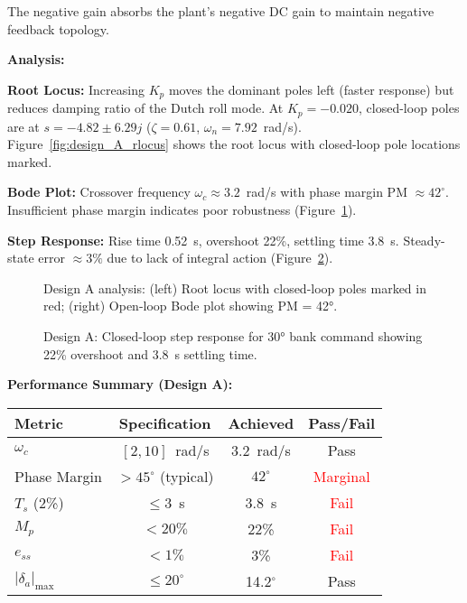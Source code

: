 The negative gain absorbs the plant's negative DC gain to maintain negative feedback topology.

\textbf{Analysis:}

\textbf{Root Locus:} Increasing $K_p$ moves the dominant poles left (faster response) but reduces damping ratio of the Dutch roll mode. At $K_p=-0.020$, closed-loop poles are at $s = -4.82 \pm 6.29j$ ($\zeta=0.61$, $\omega_n=7.92$~rad/s). Figure~\ref{fig:design_A_rlocus} shows the root locus with closed-loop pole locations marked.

\textbf{Bode Plot:} Crossover frequency $\omega_c \approx 3.2$~rad/s with phase margin PM $\approx 42^\circ$. Insufficient phase margin indicates poor robustness (Figure~\ref{fig:design_A_bode}).

\textbf{Step Response:} Rise time 0.52~s, overshoot 22\%, settling time 3.8~s. Steady-state error $\approx 3\%$ due to lack of integral action (Figure~\ref{fig:design_A_step}).

\begin{figure}[H]
\centering
\hspace{0.5cm}%

\caption{Design A analysis: (left) Root locus with closed-loop poles marked in red; (right) Open-loop Bode plot showing PM = 42°.}
\label{fig:design_A_rlocus}
\label{fig:design_A_bode}
\end{figure}

\begin{figure}[h!]
\centering
\resizebox{0.7\textwidth}{!}{}
\caption{Design A: Closed-loop step response for 30° bank command showing 22\% overshoot and 3.8~s settling time.}
\label{fig:design_A_step}
\end{figure}

\textbf{Performance Summary (Design A):}
\begin{center}
\begin{tabular}{lccc}
\hline
\textbf{Metric} & \textbf{Specification} & \textbf{Achieved} & \textbf{Pass/Fail} \\
\hline
$\omega_c$ & $[2,10]$~rad/s & 3.2~rad/s & \textcolor{green!60!black}{Pass} \\
Phase Margin & $>45^\circ$ (typical) & $42^\circ$ & \textcolor{red}{Marginal} \\
$T_s$ (2\%) & $\le 3$~s & 3.8~s & \textcolor{red}{Fail} \\
$M_p$ & $<20\%$ & 22\% & \textcolor{red}{Fail} \\
$e_{ss}$ & $<1\%$ & 3\% & \textcolor{red}{Fail} \\
$|\delta_a|_{\max}$ & $\le 20^\circ$ & 14.2$^\circ$ & \textcolor{green!60!black}{Pass} \\
\hline
\end{tabular}
\end{center}

